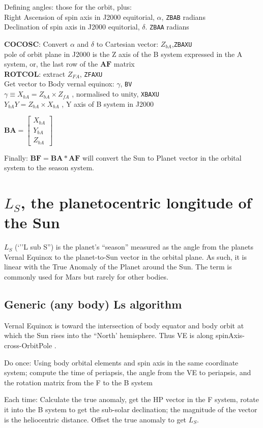\documentclass[draft]{article}
\newcommand{\qi}{\\ \hspace*{2.em}}      %
\newcommand{\np}{\textbf}  %
\newcommand{\nv}{\texttt}  %
\begin{document}
Defining angles: those for the orbit, plus:
\qi Right Ascension of spin axis in J2000 equitorial, $\alpha$,  \nv{ZBAB} radians
\qi Declination of spin axis in J2000 equitorial,  $\delta$. \nv{ZBAA} radians

 \np{COCOSC}: Convert  $\alpha$ and  $\delta$  to Cartesian vector: $Z_{bA}$,\nv{ZBAXU}
\\ pole of orbit plane in J2000 is the Z axis of the B system expressed in the A system, or, the last row of the $ \mathbf{AF} $ matrix
\qi  \np{ROTCOL}: extract  $Z_{FA}$, \nv{ZFAXU}
\\ Get vector to Body vernal equinox: $\gamma$, \nv{BV}
\qi $\gamma \equiv X_{bA} = Z_{bA} \times Z_{fA}$ , normalised to unity, \nv{XBAXU}
\qi $ Y_{bA}Y = Z_{bA} \times X_{bA}$ , Y axis of B system in J2000

$\mathbf{BA} =\left[ \begin{array}{c}  X_{bA} \\ Y_{bA}  \\ Z_{bA} \end{array}  \right] $

Finally: $\mathbf{BF} = \mathbf{BA} \ast \mathbf{AF} $ will convert the Sun to Planet vector in the orbital system to the season system.

\section{$L_S$, the planetocentric longitude of the Sun}
$L_S$ (`''L sub S'') is the planet's ``season'' measured as the angle from the planets Vernal Equinox to the planet-to-Sun vector in the orbital plane. As such, it is linear with the True Anomaly of the Planet around the Sun. The term is commonly used for Mars but rarely for other bodies.

\subsection{Generic (any body) Ls algorithm}

Vernal Equinox is toward the intersection of body equator and body orbit at
which the Sun rises into the ``North' hemisphere. Thus VE is along
spinAxis-cross-OrbitPole .

Do once: Using body orbital elements and spin axis in the same coordinate system; compute the time of periapsis, the angle from the VE to periapsis, and the rotation matrix from the F to the B system

Each time: Calculate the true anomaly, get the HP vector in the F system, rotate it into the B system to get the sub-solar declination; the magnitude of the vector is the heliocentric distance. Offset the true anomaly to get $L_S$.
\end{document}
